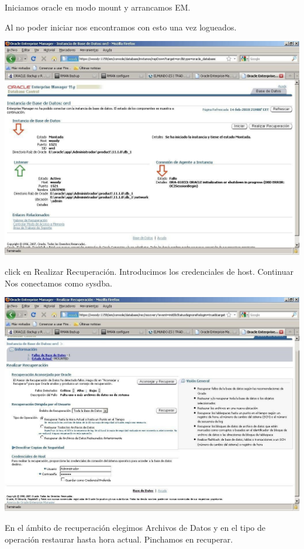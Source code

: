 \documentclass[a4paper,openright,12pt]{book}
\begin{document}
Iniciamos oracle en modo mount y arrancamos EM.

Al no poder iniciar nos encontramos con esto una vez logueados.

\begin{center}
\includegraphics[width=15cm]{./images/backup/9.jpg}
\end{center}
click en Realizar Recuperación. Introducimos los credenciales de host. Continuar Nos conectamos como sysdba.
\begin{center}
\includegraphics[width=15cm]{./images/backup/10.jpg}
\end{center}
En el ámbito de recuperación elegimos Archivos de Datos y en el tipo de operación restaurar hasta hora actual. Pinchamos en recuperar.
\end{document}
